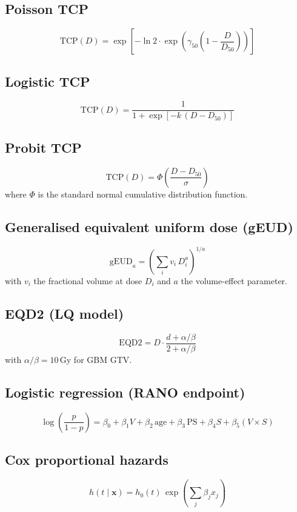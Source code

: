 
\subsection*{Poisson TCP}
\begin{equation}
\mathrm{TCP}(D) = \exp\!\left[-\ln 2 \cdot \exp\!\left(\gamma_{50}\left(1 - \frac{D}{D_{50}}\right)\right)\right]
\end{equation}

\subsection*{Logistic TCP}
\begin{equation}
\mathrm{TCP}(D) = \frac{1}{1 + \exp\!\left[-k\,(D - D_{50})\right]}
\end{equation}

\subsection*{Probit TCP}
\begin{equation}
\mathrm{TCP}(D) = \Phi\!\left(\frac{D - D_{50}}{\sigma}\right)
\end{equation}
where $\Phi$ is the standard normal cumulative distribution function.

\subsection*{Generalised equivalent uniform dose (gEUD)}
\begin{equation}
\mathrm{gEUD}_a = \left(\sum_i v_i\, D_i^{a}\right)^{1/a}
\end{equation}
with $v_i$ the fractional volume at dose $D_i$ and $a$ the volume-effect parameter.

\subsection*{EQD2 (LQ model)}
\begin{equation}
\mathrm{EQD2} = D \cdot \frac{d + \alpha/\beta}{2 + \alpha/\beta}
\end{equation}
with $\alpha/\beta = 10$\,Gy for GBM GTV.

\subsection*{Logistic regression (RANO endpoint)}
\begin{equation}
\log\!\left(\frac{p}{1-p}\right) = \beta_0 + \beta_1 V + \beta_2\,\mathrm{age} + \beta_3\,\mathrm{PS} + \beta_4 S + \beta_5 (V \times S)
\end{equation}

\subsection*{Cox proportional hazards}
\begin{equation}
h(t \mid \mathbf{x}) = h_0(t)\,\exp\!\left(\sum_j \beta_j x_j\right)
\end{equation}
